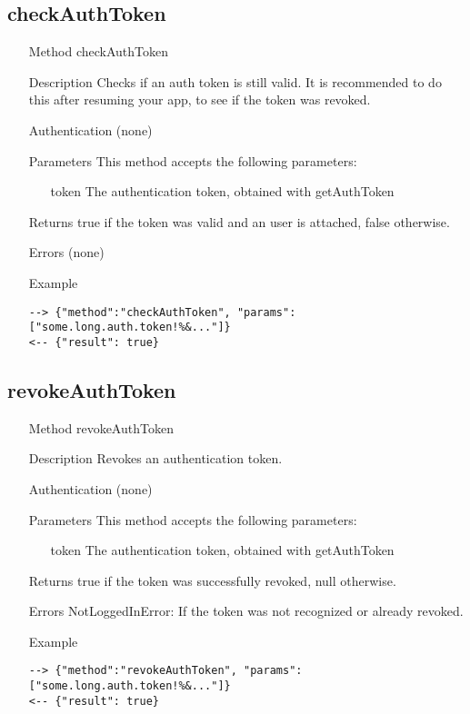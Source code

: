 \documentclass[a4paper]{scrreprt}
\begin{document}
\subsection{checkAuthToken}
\begin{enumerate}
\item[Method] checkAuthToken
\item[Description] Checks if an auth token is still valid. It is recommended to do this after resuming your app, to see if the token was revoked.
\item[Authentication] (none)
\item[Parameters] This method accepts the following parameters:
\begin{enumerate}
    \item[token] The authentication token, obtained with getAuthToken
    \end{enumerate}
\item[Returns] true if the token was valid and an user is attached, false otherwise.
\item[Errors] (none)
\item[Example]
\begin{lstlisting}
--> {"method":"checkAuthToken", "params":["some.long.auth.token!%&..."]}
<-- {"result": true}
\end{lstlisting}
\end{enumerate}

\subsection{revokeAuthToken}
\begin{enumerate}
\item[Method] revokeAuthToken
\item[Description] Revokes an authentication token.
\item[Authentication] (none)
\item[Parameters] This method accepts the following parameters:
\begin{enumerate}
    \item[token] The authentication token, obtained with getAuthToken
    \end{enumerate}
\item[Returns] true if the token was successfully revoked, null otherwise.
\item[Errors] NotLoggedInError: If the token was not recognized or already revoked.
\item[Example]
\begin{lstlisting}
--> {"method":"revokeAuthToken", "params":["some.long.auth.token!%&..."]}
<-- {"result": true}
\end{lstlisting}
\end{enumerate}
\end{document}
